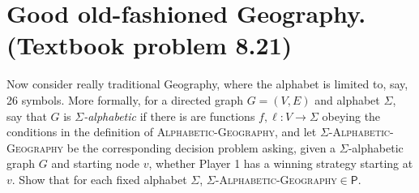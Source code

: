 

\maketitle
\thispagestyle{firststyle}
\vspace{-2.0cm}

\section{Good old-fashioned Geography. (Textbook problem 8.21)}
Now consider really traditional Geography, where the alphabet is limited to, say, 26 symbols.
More formally,
for a directed graph $G=(V,E)$ and alphabet $\Sigma$,
say that $G$ is \emph{$\Sigma$-alphabetic} if there is are functions $f,\ell:V \to \Sigma$
obeying the conditions in the definition of \textsc{Alphabetic-Geography},
and let $\Sigma$\textsc{-Alphabetic-Geography} be the corresponding decision problem asking,
given a $\Sigma$-alphabetic graph $G$ and starting node $v$,
whether Player 1 has a winning strategy starting at $v$.
Show that for each fixed alphabet $\Sigma$,
$\Sigma$\textsc{-Alphabetic-Geography}$\in\mathsf{P}$.

